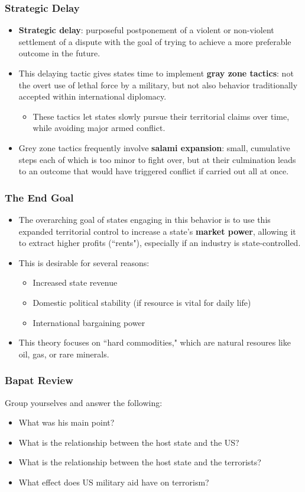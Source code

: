 \documentclass{beamer}
\begin{document}
\begin{frame} 
	\frametitle{\LARGE{Strategic Delay}}
	\begin{itemize}
		\item \textbf{Strategic delay}: purposeful postponement of a violent or non-violent settlement of a dispute  with the goal of trying to achieve a more preferable outcome in the future. \pause
		\item This delaying tactic gives states time to implement \textbf{gray zone tactics}: not the overt use of lethal  force by a military, but not also behavior traditionally accepted within international diplomacy. \pause
		\begin{itemize}
			\item These tactics let states slowly pursue their territorial claims over time, while avoiding major armed conflict. \pause
		\end{itemize}	
		\item Grey zone tactics frequently involve \textbf{salami expansion}: small, cumulative steps each of which is too minor to fight over, but at their culmination leads to an outcome that would have triggered conflict if carried out all at once. 
	\end{itemize}
\end{frame}

\begin{frame} 
	\frametitle{\LARGE{The End Goal}}
	\begin{itemize}
		\item The overarching goal of states engaging in this behavior is to use this expanded territorial control to increase a state's \textbf{market power}, allowing it to extract higher profits (``rents"), especially if an industry is state-controlled. \pause
		\item This is desirable for several reasons:
		\begin{itemize}
			\item Increased state revenue
			\item Domestic political stability (if resource is vital for daily life)
			\item International bargaining power
		\end{itemize}
		\item This theory focuses on ``hard commodities," which are natural resoures like oil, gas, or rare minerals.	
	\end{itemize}
\end{frame}

\begin{frame} 
	\frametitle{\LARGE{Bapat Review}}
	Group yourselves and answer the following:
	\begin{itemize}
		\item What was his main point?
		\item What is the relationship between the host state and the US?
		\item What is the relationship between the host state and the terrorists?
		\item What effect does US military aid have on terrorism?
	\end{itemize}
\end{frame}
\end{document}
